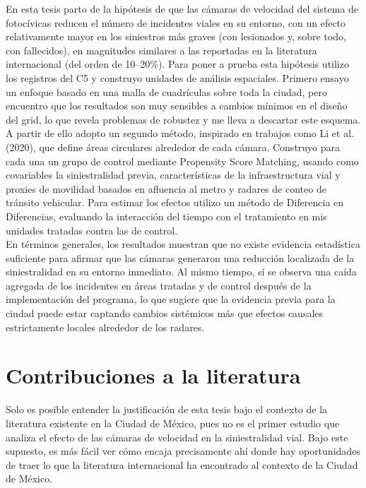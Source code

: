 En esta tesis parto de la hipótesis de que las cámaras de velocidad del sistema de fotocívicas reducen el número de incidentes viales en su entorno, con un efecto relativamente mayor en los siniestros más graves (con lesionados y, sobre todo, con fallecidos), en magnitudes similares a las reportadas en la literatura internacional (del orden de 10–20\%). Para poner a prueba esta hipótesis utilizo los registros del C5 y construyo unidades de análisis espaciales. Primero ensayo un enfoque basado en una malla de cuadrículas sobre toda la ciudad, pero encuentro que los resultados son muy sensibles a cambios mínimos en el diseño del grid, lo que revela problemas de robustez y me lleva a descartar este esquema.\\

A partir de ello adopto un segundo método, inspirado en trabajos como Li et al. (2020), que define áreas circulares alrededor de cada cámara. Construyo para cada una un grupo de control mediante Propensity Score Matching, usando como covariables la siniestralidad previa, características de la infraestructura vial y proxies de movilidad basados en afluencia al metro y radares de conteo de tránsito vehicular. Para estimar los efectos utilizo un método de Diferencia en Diferencias, evaluando la interacción del tiempo con el tratamiento en mis unidades tratadas contra las de control.\\

En términos generales, los resultados muestran que no existe evidencia estadística suficiente para afirmar que las cámaras generaron una reducción localizada de la siniestralidad en su entorno inmediato. Al mismo tiempo, sí se observa una caída agregada de los incidentes en áreas tratadas y de control después de la implementación del programa, lo que sugiere que la evidencia previa para la ciudad puede estar captando cambios sistémicos más que efectos causales estrictamente locales alrededor de los radares.

\section{Contribuciones a la literatura}
\noindent Solo es posible entender la justificación de esta tesis bajo el contexto de la literatura existente en la Ciudad de México, pues no es el primer estudio que analiza el efecto de las cámaras de velocidad en la siniestralidad vial. Bajo este supuesto, es más fácil ver cómo encaja precisamente ahí donde hay oportunidades de traer lo que la literatura internacional ha encontrado al contexto de la Ciudad de México. 

